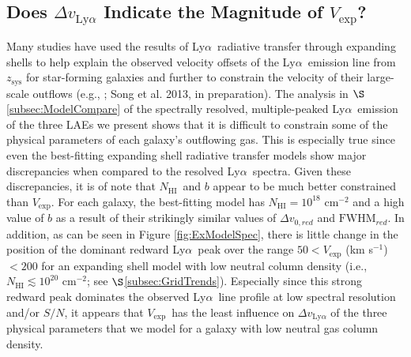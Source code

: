 \documentclass{emulateapj}
\newcommand{\lya}{Ly$\alpha$}
\def\nh{$N_{\mathrm{HI}}$}
\def\vexp{$V_{\mathrm{exp}}$}
\begin{document}
\subsection{Does $\Delta v_{\mathrm{Ly}\alpha}$ Indicate the Magnitude of $V_{\mathrm{exp}}$?}\label{subsec:Correlation?}
Many studies have used the results of \lya\ radiative transfer through expanding shells to help explain the observed velocity offsets of the \lya\ emission line from $z_{\mathrm{sys}}$ for star-forming galaxies and further to constrain the velocity of their large-scale outflows (e.g., \citealp{mclinden2011,finkelstein2011,yang2011,hashimoto2012,guaita2013}; Song et al. 2013, in preparation). The analysis in $\S$\ref{subsec:ModelCompare} of the spectrally resolved, multiple-peaked \lya\ emission of the three LAEs we present shows that it is difficult to constrain some of the physical parameters of each galaxy's outflowing gas. This is especially true since even the best-fitting expanding shell radiative transfer models show major discrepancies when compared to the resolved \lya\ spectra. Given these discrepancies, it is of note that \nh\ and $b$ appear to be much better constrained than \vexp. For each galaxy, the best-fitting model has $N_{\mathrm{HI}} = 10^{18}$ cm$^{-2}$ and a high value of $b$ as a result of their strikingly similar values of $\Delta v_{0,red}$ and $\mathrm{FWHM}_{red}$. In addition, as can be seen in Figure \ref{fig:ExModelSpec}, there is little change in the position of the dominant redward \lya\ peak over the range $50 < V_{\mathrm{exp}}$ (km s$^{-1}$) $< 200$ for an expanding shell model with low neutral column density (i.e., $N_{\mathrm{HI}} \lesssim 10^{20}$ cm$^{-2}$; see $\S$\ref{subsec:GridTrends}). Especially since this strong redward peak dominates the observed \lya\ line profile at low spectral resolution and/or $S/N$, it appears that \vexp\ has the least influence on $\Delta v_{\mathrm{Ly}\alpha}$ of the three physical parameters that we model for a galaxy with low neutral gas column density.
\end{document}

